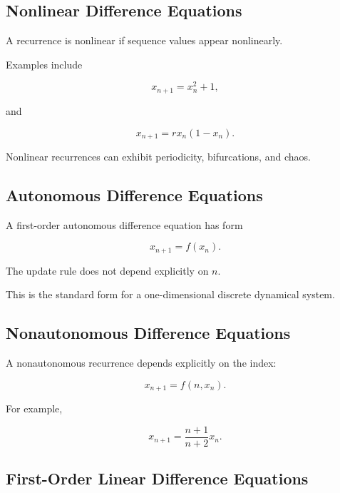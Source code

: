 \subsection{Nonlinear Difference Equations}
\label{subsec:nonlinear-difference-equations}

A recurrence is nonlinear if sequence values appear nonlinearly.

Examples include

\[
\boxed{
x_{n+1}=x_n^2+1,
}
\]

and

\[
\boxed{
x_{n+1}
=
rx_n(1-x_n).
}
\]

Nonlinear recurrences can exhibit periodicity, bifurcations, and chaos.

\subsection{Autonomous Difference Equations}
\label{subsec:autonomous-difference-equations}

A first-order autonomous difference equation has form

\[
\boxed{
x_{n+1}=f(x_n).
}
\]

The update rule does not depend explicitly on \(n\).

This is the standard form for a one-dimensional discrete dynamical
system.

\subsection{Nonautonomous Difference Equations}
\label{subsec:nonautonomous-difference-equations}

A nonautonomous recurrence depends explicitly on the index:

\[
\boxed{
x_{n+1}
=
f(n,x_n).
}
\]

For example,

\[
\boxed{
x_{n+1}
=
\frac{n+1}{n+2}x_n.
}
\]

\subsection{First-Order Linear Difference Equations}
\label{subsec:first-order-linear-difference-equations}

